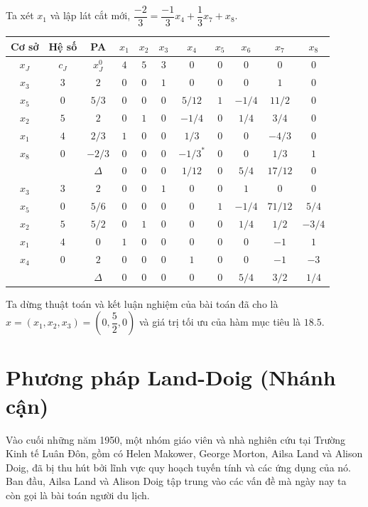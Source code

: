 \documentclass[12pt,a4paper]{report}
\begin{document}
    Ta xét $x_1$ và lập lát cắt mới, $\dfrac{-2}{3}= \dfrac{-1}{3}x_4 +\dfrac{1}{3}x_7+x_8$.
    \begin{center}
        \begin{tabular}{|c|c|c|c|c|c|c|c|c|c|c|}
        \hline
          Cơ sở & Hệ số & PA& $x_1$ &$x_2$ &$x_3$ &$x_4$ &$x_5$ &$x_6$ &$x_7$&$x_8$ \\
         \hline
          $x_J$& $c_J$ &$x_J^0$ &$4$ &$5$ &$ 3$ &$0$ &$0$ &$0$ &$0$ &$0$\\
          \hline
           $x_3$ &$3$ &$2$ &$0$ &$0$ &$1$ &$0$ &$0$ &$0$ &$1$ &$0 $\\
          $x_5$ &$0$ &$5/3$ &$0$ &$0$ &$0$ &$5/12$ &$1$ &$-1/4$ &$11/2$ &$0$\\
          $x_2$ &$5$ &$2$ &$0$ &$1$ &$0$ &$-1/4$ &$0$ &$1/4$ &$3/4$ &$0$\\
          $x_1$ &$4$ &$2/3$ &$1$ &$0$ &$0$ &$1/3$ &$0$ &$0$ &$-4/3$ &$0$\\
          $x_8$ &$0$ &$-2/3$ &$0$ &$0$ &$0$ &$-1/3^*$ &$0$ &$0$ &$1/3$ &$1$\\
          \hline
          &&$\Delta$ &$0$ &$0$ &$0$ &$1/12$ &$0$ &$5/4$ &$17/12$ &$0$\\
          \hline
          $x_3$ &$3$ &$2$ &$0$ &$0$ &$1$ &$0$ &$0$ &$1$ &$0$& $0$\\
          $x_5$ &$0$ &$5/6$ &$0$ &$0$ &$0$ &$0$ &$1$ &$-1/4$ &$71/12$ &$5/4$\\
          $x_2$ &$5$ &$5/2$ &$0$ &$1$ &$0$ &$0$ &$0$&$1/4$ &$1/2$ &$-3/4$\\
          $x_1$ &$4$ &$0$ &$1$ &$0$ &$0$ &$0$ &$0$ &$0$ &$-1$ &$1$\\
          $x_4$ &$0$ &$2$ &$0$ &$0$ &$0$ &$1$ &$0$ &$0$ &$-1$ &$-3$\\
          \hline
          &&$\Delta$ &$0$ &$0$ &$0$ &$0$ &$0$ &$5/4$ &$3/2$ &$1/4$\\
          \hline
        \end{tabular}
    \end{center} 
    Ta dừng thuật toán và kết luận nghiệm của bài toán đã cho là $x=(x_1,x_2,x_3)=\left(0,\dfrac{5}{2},0\right)$ và giá trị tối ưu của hàm mục tiêu là $18.5$.


\section{Phương pháp Land-Doig (Nhánh cận)}

Vào cuối những năm 1950, một nhóm giáo viên và nhà nghiên cứu tại Trường Kinh tế Luân Đôn, gồm có Helen Makower, George Morton, Ailsa Land và Alison Doig, đã bị thu hút bởi lĩnh vực quy hoạch tuyến tính và các ứng dụng của nó. Ban đầu, Ailsa Land và Alison Doig tập trung vào các vấn đề mà ngày nay ta còn gọi là bài toán người du lịch.
\end{document}
